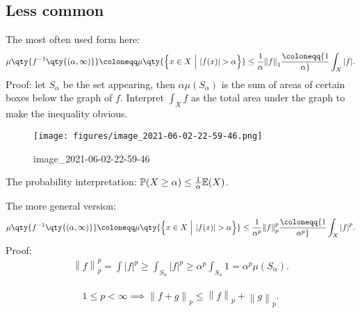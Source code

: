 \hypertarget{less-common}{%
\subsection{Less common}\label{less-common}}

\begin{proposition}

The most often used form here:
\begin{align*}  
\mu \qty{ f^{-1}\qty{(\alpha, \infty)} } \coloneqq\mu\qty{\left\{{ x\in X {~\mathrel{\Big|}~}{\left\lvert {f(x)} \right\rvert} > \alpha  }\right\}} \leq {1\over \alpha} {\left\lVert {f} \right\rVert}_1 \coloneqq{1\over \alpha} \int_X {\left\lvert {f} \right\rvert}
.\end{align*}
Proof: let \(S_\alpha\) be the set appearing, then
\(\alpha \mu(S_\alpha)\) is the sum of areas of certain boxes below the
graph of \(f\). Interpret \(\int_X f\) as the total area under the graph
to make the inequality obvious.

\begin{figure}
\centering
\texttt{[image: figures/image\_2021-06-02-22-59-46.png]}
\caption{image\_2021-06-02-22-59-46}
\end{figure}

The probability interpretation:
\({\mathbb{P}}(X\geq \alpha) \leq {1\over \alpha} {\mathbb{E}}(X)\).

The more general version:
\begin{align*}
\mu \qty{ f^{-1}\qty{(\alpha, \infty)} } \coloneqq\mu\qty{\left\{{ x\in X {~\mathrel{\Big|}~}{\left\lvert {f(x)} \right\rvert} > \alpha }\right\}  } \leq {1\over \alpha^p} {\left\lVert {f} \right\rVert}_p^p \coloneqq{1\over \alpha^p} \int_X {\left\lvert {f} \right\rvert}^p 
.\end{align*}
Proof:
\begin{align*}
{\left\lVert {f} \right\rVert}_p^p = \int {\left\lvert {f} \right\rvert}^p \geq \int_{S_\alpha} {\left\lvert {f} \right\rvert}^p \geq \alpha^p \int_{S_\alpha} 1 = \alpha^p \mu(S_\alpha)
.\end{align*}

\end{proposition}

\begin{proposition}

\begin{align*}  
1\leq p < \infty \implies {\left\lVert {f+g} \right\rVert}_{p} \leq {\left\lVert {f} \right\rVert}_{p}+ {\left\lVert {g} \right\rVert}_{p}
.\end{align*}

\end{proposition}

